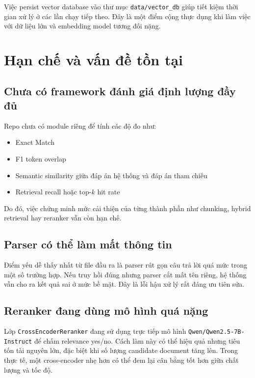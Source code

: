 \documentclass[12pt,a4paper]{article}
\begin{document}
Việc persist vector database vào thư mục \texttt{data/vector\_db} giúp tiết kiệm thời gian xử lý ở các lần chạy tiếp theo. Đây là một điểm cộng thực dụng khi làm việc với dữ liệu lớn và embedding model tương đối nặng.

\section{Hạn chế và vấn đề tồn tại}

\subsection{Chưa có framework đánh giá định lượng đầy đủ}

Repo chưa có module riêng để tính các độ đo như:
\begin{itemize}[leftmargin=1.5cm]
    \item Exact Match
    \item F1 token overlap
    \item Semantic similarity giữa đáp án hệ thống và đáp án tham chiếu
    \item Retrieval recall hoặc top-\(k\) hit rate
\end{itemize}

Do đó, việc chứng minh mức cải thiện của từng thành phần như chunking, hybrid retrieval hay reranker vẫn còn hạn chế.

\subsection{Parser có thể làm mất thông tin}

Điểm yếu dễ thấy nhất từ file đầu ra là parser rút gọn câu trả lời quá mức trong một số trường hợp. Nếu truy hồi đúng nhưng parser cắt mất tên riêng, hệ thống vẫn cho ra kết quả sai ở mức bề mặt. Đây là lỗi hậu xử lý rất đáng ưu tiên sửa.

\subsection{Reranker đang dùng mô hình quá nặng}

Lớp \texttt{CrossEncoderReranker} đang sử dụng trực tiếp mô hình \texttt{Qwen/Qwen2.5-7B-Instruct} để chấm relevance yes/no. Cách làm này có thể hiệu quả nhưng tiêu tốn tài nguyên lớn, đặc biệt khi số lượng candidate document tăng lên. Trong thực tế, một cross-encoder nhẹ hơn có thể đem lại cân bằng tốt hơn giữa chất lượng và tốc độ.
\end{document}
